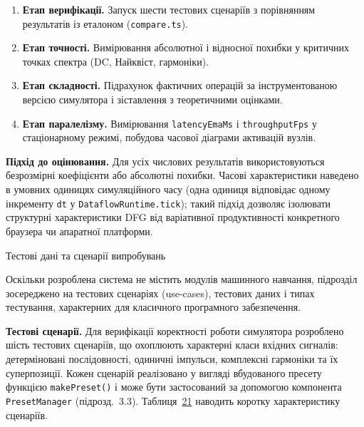\begin{enumerate}
\def\labelenumi{\arabic{enumi}.}
\item
  \textbf{Етап верифікації.} Запуск шести тестових сценаріїв з
  порівнянням результатів із еталоном (\texttt{compare.ts}).
\item
  \textbf{Етап точності.} Вимірювання абсолютної і відносної похибки у
  критичних точках спектра (DC, Найквіст, гармоніки).
\item
  \textbf{Етап складності.} Підрахунок фактичних операцій за
  інструментованою версією симулятора і зіставлення з теоретичними
  оцінками.
\item
  \textbf{Етап паралелізму.} Вимірювання \texttt{latencyEmaMs} і
  \texttt{throughputFps} у стаціонарному режимі, побудова часової
  діаграми активацій вузлів.
\end{enumerate}

\textbf{Підхід до оцінювання.} Для усіх числових результатів
використовуються безрозмірні коефіцієнти або абсолютні похибки. Часові
характеристики наведено в умовних одиницях симуляційного часу (одна
одиниця відповідає одному інкременту \texttt{dt} у
\texttt{DataflowRuntime.tick}); такий підхід дозволяє ізолювати
структурні характеристики DFG від варіативної продуктивності конкретного
браузера чи апаратної платформи.

\protect{}\label{_Toc229681166}{}Тестові дані та сценарії
випробувань

Оскільки розроблена система не містить модулів машинного навчання,
підрозділ зосереджено на тестових сценаріях (use-cases), тестових даних
і типах тестування, характерних для класичного програмного забезпечення.

\textbf{Тестові сценарії.} Для верифікації коректності роботи симулятора
розроблено шість тестових сценаріїв, що охоплюють характерні класи
вхідних сигналів: детерміновані послідовності, одиничні імпульси,
комплексні гармоніки та їх суперпозиції. Кожен сценарій реалізовано у
вигляді вбудованого пресету функцією \texttt{makePreset()} і може бути
застосований за допомогою компонента \texttt{PresetManager}
(підрозд.~3.3). Таблиця~\hyperref[tab:scenarios]{21} наводить коротку
характеристику сценаріїв.

